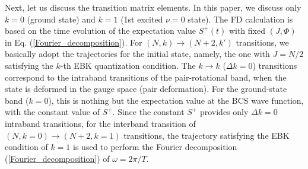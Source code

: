 \documentclass[%
superscriptaddress,
preprint,
showpacs,
nofootinbib,
amsmath,amssymb,
aps,
prc,
floatfix ]%
{revtex4-1}
\begin{document}
Next, let us discuss the transition matrix elements.
In this paper, we discuss only $k=0$ (ground state) and $k=1$
(1st excited $\nu=0$ state).
The FD calculation is based on the time evolution of the expectation 
value $S^+(t)$ with fixed $(J,\Phi)$ in Eq. (\ref{Fourier_decomposition}).
For $(N,k)\rightarrow (N+2,k')$ transitions,
we basically adopt the trajectories for the initial state, namely,
the one with $J=N/2$ satisfying the $k$-th EBK quantization condition.
The $k\rightarrow k$ ($\Delta k = 0$)  transitions
correspond to the intraband transitions of the
pair-rotational band, when the state is deformed in the
gauge space (pair deformation).
For the ground-state band ($k=0$),
this is nothing but the expectation value at the BCS wave function,
with the constant value of $S^+$.
Since the constant $S^+$ provides only $\Delta k=0$ intraband transitions,
for the interband transition of $(N,k=0)\rightarrow (N+2,k=1)$
transitions, the trajectory satisfying the EBK condition of $k=1$ is used to
perform the Fourier decomposition (\ref{Fourier_decomposition})
of $\omega=2\pi/T$.
\end{document}
